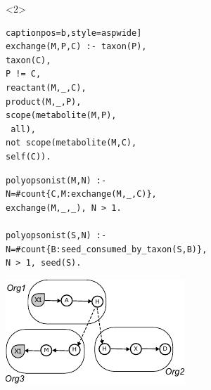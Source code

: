 \documentclass[8pt,usenames,dvipsnames]{beamer}
\begin{document}
\begin{frame}[fragile]
\begin{onlyenv}
\begin{minipage}{0.45\textwidth}
\end{minipage}
\end{onlyenv}

\begin{onlyenv}<2>
\begin{minipage}{0.5\textwidth}
\begin{lstlisting}[mathescape=True, label={lst:echange}] captionpos=b,style=aspwide]
exchange(M,P,C) :- taxon(P),
taxon(C),
P != C,
reactant(M,_,C),
product(M,_,P),
scope(metabolite(M,P),
 all),
not scope(metabolite(M,C), 
self(C)).
\end{lstlisting}
\begin{lstlisting}[mathescape=True,label={lst:competition}, captionpos=b]
polyopsonist(M,N) :- 
N=#count{C,M:exchange(M,_,C)},
exchange(M,_,_), N > 1.
		 	
polyopsonist(S,N) :-
N=#count{B:seed_consumed_by_taxon(S,B)}, 
N > 1, seed(S).
\end{lstlisting}
\end{minipage}%
\hspace{0.25cm}
\hfill
\begin{minipage}{0.45\textwidth}
\includegraphics[width=\textwidth]{figures/exchanged.pdf}
\end{minipage}
\end{onlyenv}
\end{frame}
\end{document}
